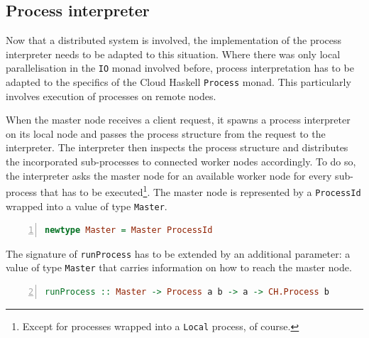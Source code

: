 \subsection{Process interpreter}
\label{chp:interpreter}
Now that a distributed system is involved, the implementation of the process interpreter needs to be adapted to this situation. Where there was only local parallelisation in the \texttt{IO} monad involved before, process interpretation has to be adapted to the specifics of the \textsf{Cloud Haskell} \texttt{Process} monad. This particularly involves execution of processes on remote nodes.

When the master node receives a client request, it spawns a process interpreter on its local node and passes the process structure from the request to the interpreter. The interpreter then inspects the process structure and distributes the incorporated sub-processes to connected worker nodes accordingly. To do so, the interpreter asks the master node for an available worker node for every sub-process that has to be executed\footnote{Except for processes wrapped into a \texttt{Local} process, of course.}. The master node is represented by a \texttt{ProcessId} wrapped into a value of type \texttt{Master}.
\begin{lstlisting}[language=Haskell,caption=Data type for the address of a master node.,numbers=left,frame=bt]
newtype Master = Master ProcessId
\end{lstlisting}

The signature of \texttt{runProcess} has to be extended by an additional parameter: a value of type \texttt{Master} that carries information on how to reach the master node.
\begin{lstlisting}[language=Haskell,caption=Signature of the process interpreter.,label=lst:interpreter_signature,numbers=left,frame=bt,firstnumber=2]
runProcess :: Master -> Process a b -> a -> CH.Process b
\end{lstlisting}


